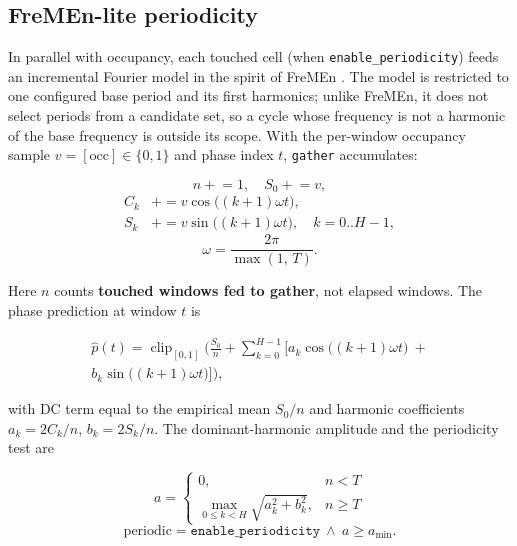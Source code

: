 \documentclass[conference]{IEEEtran}
\begin{document}
\subsection{FreMEn-lite periodicity}
\label{sec:periodicity}

In parallel with occupancy, each touched cell (when \texttt{enable\_periodicity}) feeds
an incremental Fourier model in the spirit of FreMEn \cite{krajnik2017fremen}. The
model is restricted to one configured base period and its first harmonics;
unlike FreMEn, it does not select periods from a candidate set, so a cycle
whose frequency is not a harmonic of the base frequency is outside its scope.
With the per-window occupancy sample $v=[\text{occ}]\in\{0,1\}$ and phase index $t$,
\texttt{gather} accumulates:

\begin{equation}
n \mathrel{+}= 1,\quad S_0 \mathrel{+}= v,
\end{equation}
\begin{equation}
\begin{split}
C_k &\mathrel{+}= v\cos\!\big((k{+}1)\omega t\big),\\
S_k &\mathrel{+}= v\sin\!\big((k{+}1)\omega t\big),\quad k=0..H{-}1,
\end{split}
\end{equation}
\begin{equation}
\omega = \frac{2\pi}{\max(1,\,T)}.
\end{equation}

Here $n$ counts \textbf{touched windows fed to gather}, not elapsed windows. The
phase prediction at window $t$ is

\begin{equation}
\begin{split}
\hat p(t)=\operatorname{clip}_{[0,1]}\Bigg(\frac{S_0}{n}+\sum_{k=0}^{H-1}
\Big[a_k\cos\!\big((k{+}1)\omega t\big)\ + \\
b_k\sin\!\big((k{+}1)\omega t\big)\Big]\Bigg),
\end{split}
\end{equation}

with DC term equal to the empirical mean $S_0/n$ and harmonic coefficients
$a_k=2C_k/n$, $b_k=2S_k/n$. The dominant-harmonic amplitude and the periodicity
test are

\begin{equation}
a=\begin{cases}0, & n < T\\[4pt]
\displaystyle\max_{0\le k<H}\sqrt{a_k^2+b_k^2}, & n \ge T\end{cases}
\end{equation}
\begin{equation}
\text{periodic}=\texttt{enable\_periodicity}\ \land\ a \ge a_{\min}.
\end{equation}
\end{document}
